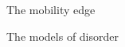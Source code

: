 \documentclass[1pt]{beamer}
\newcommand{\dd}{\,\mathrm{d}}
\begin{document}
\begin{frame}{The mobility edge}

\begin{figure}
\end{figure}


\end{frame}

\begin{frame}{The models of disorder}
\end{frame}
\end{document}
